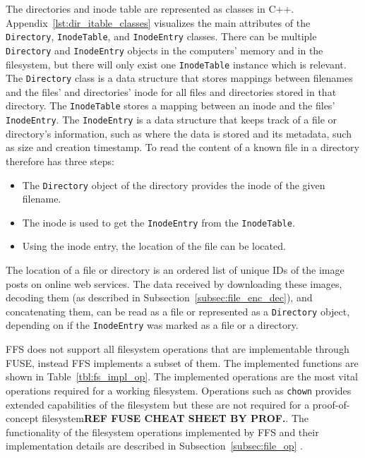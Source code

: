 The directories and inode table are represented as classes in C++. Appendix~\ref{lst:dir_itable_classes} visualizes the main attributes of the \texttt{Directory}, \texttt{InodeTable}, and \texttt{InodeEntry} classes. There can be multiple \texttt{Directory} and \texttt{InodeEntry} objects in the computers' memory and in the filesystem, but there will only exist one \texttt{InodeTable} instance which is relevant. The \texttt{Directory} class is a data structure that stores mappings between filenames and the files' and directories' inode for all files and directories stored in that directory. The \texttt{InodeTable} stores a mapping between an inode and the files' \texttt{InodeEntry}. The \texttt{InodeEntry} is a data structure that keeps track of a file or directory's information, such as where the data is stored and its metadata, such as size and creation timestamp. To read the content of a known file in a directory therefore has three steps:
\begin{itemize}
	\item The \texttt{Directory} object of the directory provides the inode of the given filename.
	\item The inode is used to get the \texttt{InodeEntry} from the \texttt{InodeTable}.
	\item Using the inode entry, the location of the file can be located.
\end{itemize}
The location of a file or directory is an ordered list of unique IDs of the image posts on online web services. The data received by downloading these images, decoding them (as described in Subsection~\ref{subsec:file_enc_dec}), and concatenating them, can be read as a file or represented as a \texttt{Directory} object, depending on if the \texttt{InodeEntry} was marked as a file or a directory.

FFS does not support all filesystem operations that are implementable through FUSE, instead FFS implements a subset of them. The implemented functions are shown in Table~\ref{tbl:fs_impl_op}. The implemented operations are the most vital operations required for a working filesystem. Operations such as \texttt{chown} provides extended capabilities of the filesystem but these are not required for a proof-of-concept filesystem\textbf{REF FUSE CHEAT SHEET BY PROF.}. The functionality of the filesystem operations implemented by FFS and their implementation details are described in Subsection~\ref{subsec:file_op} .

